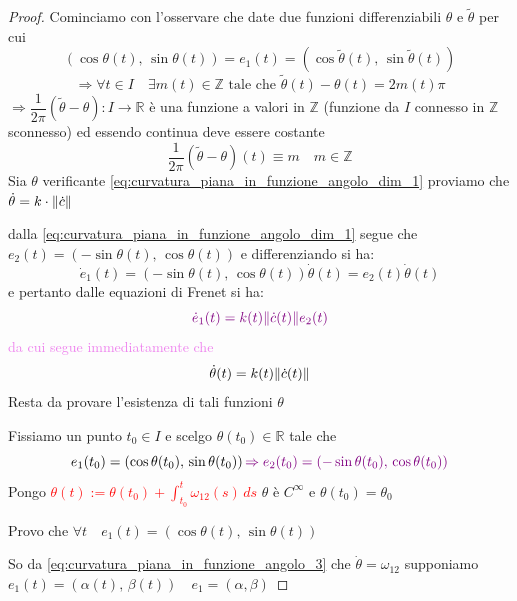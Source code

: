         \begin{proof}
        \mbox{}

        Cominciamo con l'osservare che date due funzioni differenziabili $\theta$ e $\tilde{\theta}$ per cui 
        \begin{equation}
        \label{eq:curvatura_piana_in_funzione_angolo_dim_1}
        \left( \cos \theta (t), \, \sin \theta (t) \right) = e_1(t) = \left( \cos \tilde{\theta} (t), \, \sin \tilde{\theta} (t) \right)
        \end{equation}
        \[ \Rightarrow \forall t \in I \quad \exists m(t) \in \mathbb{Z} \text{ tale che } \tilde{\theta}(t) - \theta(t) = 2m(t)\pi \]
        $\Rightarrow \dfrac{1}{2\pi} \left(\tilde{\theta} - \theta \right) \colon I \to \mathbb{R}$ è una funzione a valori in $\mathbb{Z}$ 
        \textcolor{blu}{(funzione da $I$ connesso in $\mathbb{Z}$ sconnesso)} ed essendo continua deve essere costante 
        \[ \frac{1}{2 \pi } \left( \tilde{\theta} - \theta \right) (t) \equiv m \quad m \in \mathbb{Z} \]
        Sia $\theta$ verificante \eqref{eq:curvatura_piana_in_funzione_angolo_dim_1} proviamo che $\dot{\theta} =k \cdot \lVert\dot{c}\rVert$

        dalla \eqref{eq:curvatura_piana_in_funzione_angolo_dim_1} segue che $e_2(t)=\left( -\sin \theta(t), \, \cos \theta(t) \right)$ e differenziando si ha:
        \[ \dot{e}_1(t) = \left( -\sin \theta(t), \, \cos \theta(t) \right) \dot{\theta}(t) = e_2(t) \dot{\theta}(t) \]
        e pertanto dalle equazioni di Frenet si ha:
        \[ \textcolor{violet}{\dot{e}_1(t) = k(t) \lVert\dot{c}(t)\rVert e_2(t)} \]
        \textcolor{violet}{da cui segue immediatamente che }
        \[ \dot{\theta}(t) = k(t) \lVert\dot{c}(t)\rVert \]
        Resta da provare l'esistenza di tali funzioni $\theta$

        Fissiamo un punto $t_0 \in I$ e scelgo $\theta(t_0) \in \mathbb{R}$ tale che 
        \[ e_1(t_0) = \left( \cos \theta(t_0), \, \sin \theta(t_0) \right) \textcolor{violet}{\Rightarrow e_2(t_0) = \left( -\sin \theta(t_0), \, \cos \theta(t_0) \right) } \]
        Pongo \textcolor{red}{$\displaystyle \theta(t) := \theta(t_0) + \int_{t_0}^{t} \omega_{12} (s) \, ds$} $\theta$ è $C^\infty$ e $\theta(t_0)=\theta_0$

        Provo che $\forall t \quad e_1(t) = \left( \cos \theta(t), \, \sin \theta(t) \right)$

        So da \eqref{eq:curvatura_piana_in_funzione_angolo_3} che
        $\dot{\theta} = \omega_{12}$ supponiamo $ e_1(t) = \left( \alpha (t), \, \beta (t) \right) \quad e_1= \left( \alpha, \beta \right) $


\end{proof}
